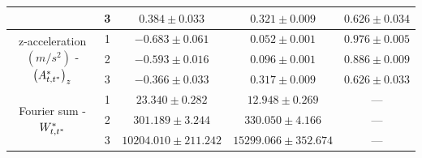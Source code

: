 \begin{table}[ht]
{\begin{tabular}{ccccc}
                                                                                   & 3                                    & $0.384 \pm 0.033$ & $0.321 \pm 0.009$ & $0.626 \pm 0.034$ \\ \hline
    \multirow{3}{*}{z-acceleration $(m/s^2)$ - $\left(A^*_{t,t^*}\right)_z$} & 1                                    & $-0.683 \pm 0.061$ & $0.052 \pm 0.001$ & $0.976 \pm 0.005$ \\
                                                                                   & 2                                    & $-0.593 \pm 0.016$ & $0.096 \pm 0.001$ & $0.886 \pm 0.009$ \\
                                                                                   & 3                                    & $-0.366 \pm 0.033$ & $0.317 \pm 0.009$ & $0.626 \pm 0.033$ \\ \hline
    \multirow{3}{*}{Fourier sum - $W^*_{t,t^*}$}                                      & 1                                    & $23.340 \pm 0.282$ & $12.948 \pm 0.269$ & ---             \\
                                                                                   & 2                                    & $301.189 \pm 3.244$ & $330.050 \pm 4.166$ & ---             \\
                                                                                   & 3                                    & $10204.010 \pm 211.242$ & $15299.066 \pm 352.674$ & ---             \\ \hline
    \end{tabular}
    }
    \label{table:emis_dists_CarHHMM-DFT}
\end{table}

